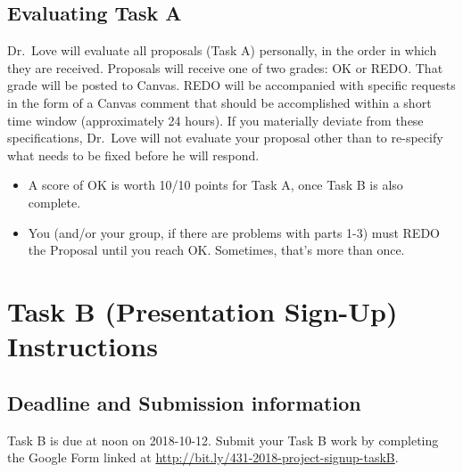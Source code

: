 \documentclass[]{book}
\providecommand{\tightlist}{%
  \setlength{\itemsep}{0pt}\setlength{\parskip}{0pt}}
\theoremstyle{definition}
\theoremstyle{definition}
\theoremstyle{definition}
\theoremstyle{remark}
\begin{document}
\hypertarget{evaluating-task-a}{%
\section{Evaluating Task A}\label{evaluating-task-a}}

Dr.~Love will evaluate all proposals (Task A) personally, in the order
in which they are received. Proposals will receive one of two grades: OK
or REDO. That grade will be posted to Canvas. REDO will be accompanied
with specific requests in the form of a Canvas comment that should be
accomplished within a short time window (approximately 24 hours). If you
materially deviate from these specifications, Dr.~Love will not evaluate
your proposal other than to re-specify what needs to be fixed before he
will respond.

\begin{itemize}
\tightlist
\item
  A score of OK is worth 10/10 points for Task A, once Task B is also
  complete.
\item
  You (and/or your group, if there are problems with parts 1-3) must
  REDO the Proposal until you reach OK. Sometimes, that's more than
  once.
\end{itemize}

\hypertarget{taskB}{%
\chapter{Task B (Presentation Sign-Up) Instructions}\label{taskB}}

\hypertarget{deadline-and-submission-information-1}{%
\section{Deadline and Submission
information}\label{deadline-and-submission-information-1}}

Task B is due at noon on 2018-10-12. Submit your Task B work by
completing the Google Form linked at
\url{http://bit.ly/431-2018-project-signup-taskB}.
\end{document}
